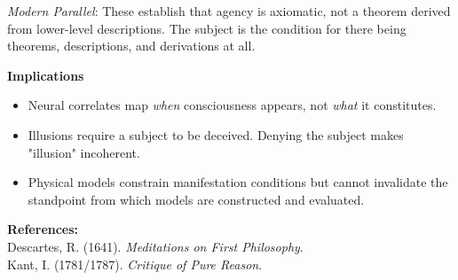 \begin{technical}
    \textit{Modern Parallel}: These establish that agency is axiomatic, not a theorem derived from lower-level descriptions. The subject is the condition for there being theorems, descriptions, and derivations at all.

    \textbf{Implications}\\[0.3em]
    \begin{itemize}[leftmargin=*,topsep=0pt,itemsep=2pt]
        \item Neural correlates map \textit{when} consciousness appears, not \textit{what} it constitutes.
        \item Illusions require a subject to be deceived. Denying the subject makes "illusion" incoherent.
        \item Physical models constrain manifestation conditions but cannot invalidate the standpoint from which models are constructed and evaluated.
    \end{itemize}

    \vspace{0.5em}
    \textbf{References:}\\
    {\footnotesize
    Descartes, R. (1641). \textit{Meditations on First Philosophy}.\\
    Kant, I. (1781/1787). \textit{Critique of Pure Reason}.\\
    }
\end{technical}